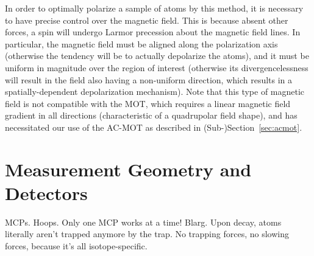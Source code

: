 

In order to optimally polarize a sample of atoms by this method, it is necessary to have precise control over the magnetic field.  This is because absent other forces, a spin will undergo Larmor precession about the magnetic field lines.  In particular, the magnetic field must be aligned along the polarization axis (otherwise the tendency will be to actually depolarize the atoms), and it must be uniform in magnitude over the region of interest (otherwise its divergencelessness will result in the field also having a non-uniform direction, which results in a spatially-dependent depolarization mechanism).  Note that this type of magnetic field is not compatible with the MOT, which requires a linear magnetic field gradient in all directions (characteristic of a quadrupolar field shape), and has necessitated our use of the AC-MOT as described in (Sub-)Section~\ref{sec:acmot}. 




\section{Measurement Geometry and Detectors}
\label{section:betadetectors}
\label{section:mcps}
\label{sec:geometry}

MCPs.  Hoops.  Only one MCP works at a time!  Blarg.  Upon decay, atoms literally aren't trapped anymore by the trap.  No trapping forces, no slowing forces, because it's all isotope-specific.

